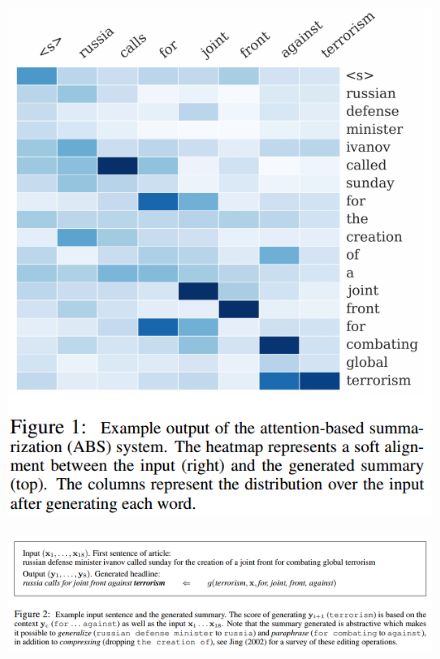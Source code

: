 \documentclass[xcolor={table}]{beamer}
\begin{document}
\begin{frame}{\cite{rush2015neural}}
\begin{figure}[h]
\centering
\includegraphics[scale=.3]{images/figure1-rush15} \\
\end{figure}
\end{frame}


\begin{frame}{\cite{rush2015neural}}
\begin{figure}[h]
\centering
\includegraphics[scale=.3]{images/figure2-rush15} \\
\end{figure}
\end{frame}
\end{document}
